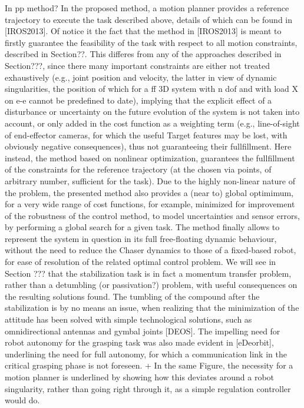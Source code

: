 In pp method?
In the proposed method, a motion planner provides a reference trajectory to execute the task described above, details of which can be found in [IROS2013]. Of notice it the fact that the method in [IROS2013] is meant to firstly guarantee the feasibility of the task with respect to all motion constraints, described in Section??. This differes from any of the approaches described in Section???, since there many important constraints are either not treated exhaustively (e.g., joint position and velocity, the latter in view of dynamic singularities, the position of which for a ff 3D system with n dof and with load X on e-e cannot be predefined to date), implying that the explicit effect of a disturbance or uncertainty on the future evolution of the system is not taken into account, or only added in the cost function as a weighting term (e.g., line-of-sight of end-effector cameras, for which the useful Target features may be lost, with obviously negative consequences), thus not guaranteeing their fullfillment. Here instead, the method based on nonlinear optimization, guarantees the fullfillment of the constraints for the reference trajectory (at the chosen via points, of arbitrary number, sufficient for the task). Due to the highly non-linear nature of the problem, the presented method also provides a (near to) global optimimum, for a very wide range of cost functions, for example,  minimized for improvement of the robustness of the control method, to model uncertainties and sensor errors, by performing a global search for a given task. The method finally allows to represent the system in question in its full free-floating dynamic behaviour, without the need to reduce the Chaser dynamics to those of a fixed-based robot, for ease of resolution of the related optimal control problem. We will see in Section ??? that the stabilization task is in fact a momentum transfer problem, rather than a detumbling (or passivation?) problem, with useful consequences on the resulting solutions found. The tumbling of the compound after the stabilization is by no means an issue, when realizing that the minimization of the attitude has been solved with simple technological solutions, such as omnidirectional antennas and gymbal joints [DEOS]. The impelling need for robot autonomy for the grasping task was also made evident in [eDeorbit], underlining the need for full autonomy, for which a communication link in the critical grasping phase is not foreseen.
+ In the same Figure, the necessity for a motion planner is underlined by showing how this deviates around a robot singularity, rather than going right through it, as a simple regulation controller would do.
